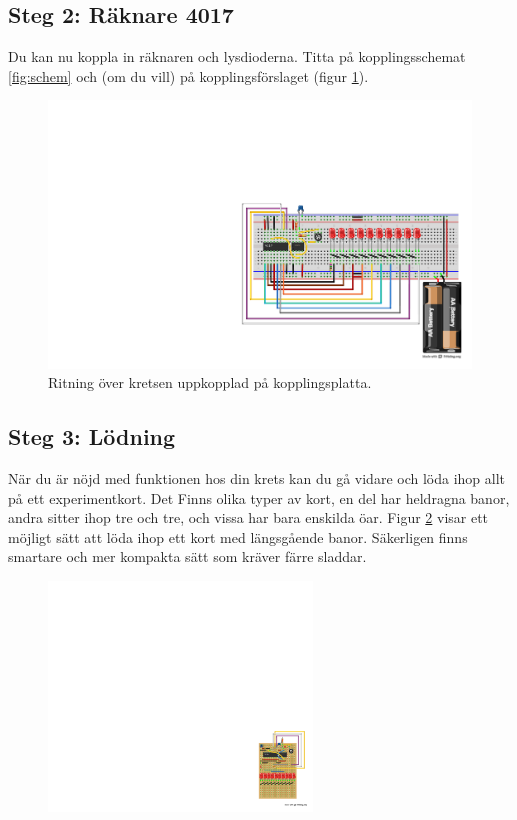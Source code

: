\documentclass{article}
\begin{document}
\subsection*{Steg 2: Räknare 4017}
Du kan nu koppla in räknaren och lysdioderna. Titta på kopplingsschemat \ref{fig:schem} och (om du vill) på kopplingsförslaget (figur \ref{fig:kopplingsplatta}).

\begin{figure}[H]
\centering
\includegraphics[width=13cm]{fig/rinnande_ljus_bb.pdf}
\caption{Ritning över kretsen uppkopplad på kopplingsplatta.}
\label{fig:kopplingsplatta}
\end{figure}

\subsection*{Steg 3: Lödning}
När du är nöjd med funktionen hos din krets kan du gå vidare och löda ihop allt på ett experimentkort. Det Finns olika typer av kort, en del har heldragna banor, andra sitter ihop tre och tre, och vissa har bara enskilda öar. Figur \ref{fig:experimentkort} visar ett möjligt sätt att löda ihop ett kort med längsgående banor. Säkerligen finns smartare och mer kompakta sätt som kräver färre sladdar.

\begin{figure}[H]
\centering
\includegraphics[width=7cm]{fig/rinnande_ljus_protoboard_bb.pdf}
\caption{}
\label{fig:experimentkort}
\end{figure}
\end{document}
